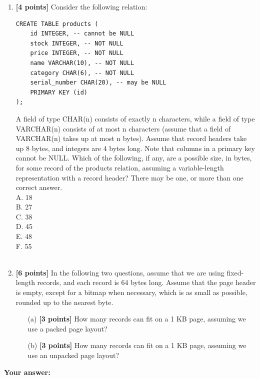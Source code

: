 \documentclass[10pt]{article}
\begin{document}
\begin{enumerate}
	\item \textbf{[4 points]}
	      Consider the following relation:
	      \begin{verbatim}
CREATE TABLE products (
	id INTEGER, -- cannot be NULL
	stock INTEGER, -- NOT NULL
	price INTEGER, -- NOT NULL
	name VARCHAR(10), -- NOT NULL
	category CHAR(6), -- NOT NULL
	serial_number CHAR(20), -- may be NULL
	PRIMARY KEY (id)
);
\end{verbatim}
	      A field of type CHAR(n) consists of exactly n characters, while a
	      field of type VARCHAR(n) consists of at most n characters (assume
	      that a field of VARCHAR(n) takes up at most n bytes). Assume that
	      record headers take up 8 bytes, and integers are 4 bytes long. Note
	      that columns in a primary key cannot be NULL. Which of the following, if any, are a possible size,
	      in bytes, for some record of the products relation, assuming a variable-length
	      representation with a record header? There may be one, or more
	      than one correct answer. \\
	      A. 18\\
	      B. 27\\
	      C. 38\\
	      D. 45\\
	      E. 48\\
	      F. 55\\
	      \\

	\item \textbf{[6 points]}
	      In the following two questions, assume that we are using fixed-length
	      records, and each record is 64 bytes long. Assume that the page header
	      is empty, except for a bitmap when necessary, which is as small as
	      possible, rounded up to the nearest byte.
	      \begin{itemize}
		      \item[(a)] \textbf{[3 points]} How many records can fit on a 1 KB page, assuming we
		            use a packed page layout?
		      \item[(b)] \textbf{[3 points]} How many records can fit on a 1 KB page, assuming we
		            use an unpacked page layout?
	      \end{itemize}

\end{enumerate}
\textbf{Your answer:}
\end{document}
